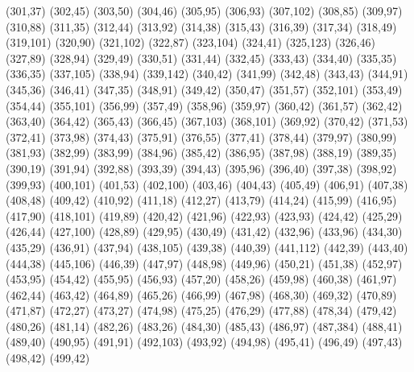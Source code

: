 (301,37)
(302,45)
(303,50)
(304,46)
(305,95)
(306,93)
(307,102)
(308,85)
(309,97)
(310,88)
(311,35)
(312,44)
(313,92)
(314,38)
(315,43)
(316,39)
(317,34)
(318,49)
(319,101)
(320,90)
(321,102)
(322,87)
(323,104)
(324,41)
(325,123)
(326,46)
(327,89)
(328,94)
(329,49)
(330,51)
(331,44)
(332,45)
(333,43)
(334,40)
(335,35)
(336,35)
(337,105)
(338,94)
(339,142)
(340,42)
(341,99)
(342,48)
(343,43)
(344,91)
(345,36)
(346,41)
(347,35)
(348,91)
(349,42)
(350,47)
(351,57)
(352,101)
(353,49)
(354,44)
(355,101)
(356,99)
(357,49)
(358,96)
(359,97)
(360,42)
(361,57)
(362,42)
(363,40)
(364,42)
(365,43)
(366,45)
(367,103)
(368,101)
(369,92)
(370,42)
(371,53)
(372,41)
(373,98)
(374,43)
(375,91)
(376,55)
(377,41)
(378,44)
(379,97)
(380,99)
(381,93)
(382,99)
(383,99)
(384,96)
(385,42)
(386,95)
(387,98)
(388,19)
(389,35)
(390,19)
(391,94)
(392,88)
(393,39)
(394,43)
(395,96)
(396,40)
(397,38)
(398,92)
(399,93)
(400,101)
(401,53)
(402,100)
(403,46)
(404,43)
(405,49)
(406,91)
(407,38)
(408,48)
(409,42)
(410,92)
(411,18)
(412,27)
(413,79)
(414,24)
(415,99)
(416,95)
(417,90)
(418,101)
(419,89)
(420,42)
(421,96)
(422,93)
(423,93)
(424,42)
(425,29)
(426,44)
(427,100)
(428,89)
(429,95)
(430,49)
(431,42)
(432,96)
(433,96)
(434,30)
(435,29)
(436,91)
(437,94)
(438,105)
(439,38)
(440,39)
(441,112)
(442,39)
(443,40)
(444,38)
(445,106)
(446,39)
(447,97)
(448,98)
(449,96)
(450,21)
(451,38)
(452,97)
(453,95)
(454,42)
(455,95)
(456,93)
(457,20)
(458,26)
(459,98)
(460,38)
(461,97)
(462,44)
(463,42)
(464,89)
(465,26)
(466,99)
(467,98)
(468,30)
(469,32)
(470,89)
(471,87)
(472,27)
(473,27)
(474,98)
(475,25)
(476,29)
(477,88)
(478,34)
(479,42)
(480,26)
(481,14)
(482,26)
(483,26)
(484,30)
(485,43)
(486,97)
(487,384)
(488,41)
(489,40)
(490,95)
(491,91)
(492,103)
(493,92)
(494,98)
(495,41)
(496,49)
(497,43)
(498,42)
(499,42)
